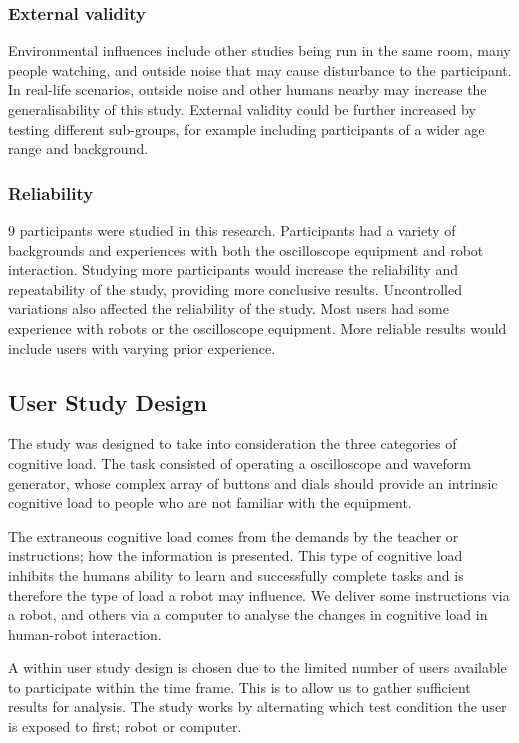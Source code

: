 \documentclass[conference]{IEEEtran}
\begin{document}
\subsubsection{External validity}
Environmental influences include other studies being run in the same room, many people watching, and outside noise that may cause disturbance to the participant. In real-life scenarios, outside noise and other humans nearby may increase the generalisability of this study. External validity could be further increased by testing different sub-groups, for example including participants of a wider age range and background.

\subsubsection{Reliability}
9 participants were studied in this research. Participants had a variety of backgrounds and experiences with both the oscilloscope equipment and robot interaction. Studying more participants would increase the reliability and repeatability of the study, providing more conclusive results. Uncontrolled variations also affected the reliability of the study. Most users had some experience with robots or the oscilloscope equipment. More reliable results would include users with varying prior experience.

\subsection{User Study Design}
The study was designed to take into consideration the three categories of cognitive load. The task consisted of operating a oscilloscope and waveform generator, whose complex array of buttons and dials should provide an intrinsic cognitive load to people who are not familiar with the equipment. 

The extraneous cognitive load comes from the demands by the teacher or instructions; how the information is presented. This type of cognitive load inhibits the humans ability to learn and successfully complete tasks and is therefore the type of load a robot may influence. We deliver some instructions via a robot, and others via a computer to analyse the changes in cognitive load in human-robot interaction.

A within user study design is chosen due to the limited number of users available to participate within the time frame. This is to allow us to gather sufficient results for analysis. The study works by alternating which test condition the user is exposed to first; robot or computer.
\end{document}
